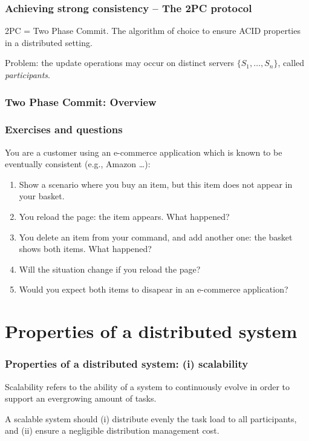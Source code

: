 \documentclass{beamer}
\begin{document}
\begin{frame}
\frametitle{Achieving strong consistency -- The 2PC protocol}

2PC = Two Phase Commit. The algorithm of choice to ensure ACID properties
in a distributed setting.

\vfill

\alert{Problem}: the update operations may occur on distinct
 servers $\{S_1, \ldots, S_n\}$, called \emph{participants}.

\end{frame}

\begin{frame}
\frametitle{Two Phase Commit: Overview}

 \figSlideWithSize{2pc}{11cm}


\end{frame}


\begin{frame}
\frametitle{Exercises and questions}

You are a customer using an e-commerce application which is known to be
eventually consistent (e.g., Amazon \ldots):
\begin{enumerate}
  \item Show a scenario where you buy an item, but this item does not appear
  in your basket.
  \item You reload the page: the item appears. What happened?
  \item You delete an item from your command, and add another one: the basket
  shows both items. What happened?
  \item Will the situation change if you reload the page?
  \item Would you expect both items to disapear in an e-commerce application?
\end{enumerate}

\end{frame}


\section{Properties of a distributed system}

\begin{frame}
\frametitle{Properties of a distributed system: (i) scalability}

\alert{Scalability} refers to the ability of a system to 
 continuously evolve in order to support an evergrowing amount
 of tasks. 


A scalable system should (i) distribute evenly the task load to all
participants, and (ii) ensure a negligible  distribution management cost.
\end{frame}
\end{document}
